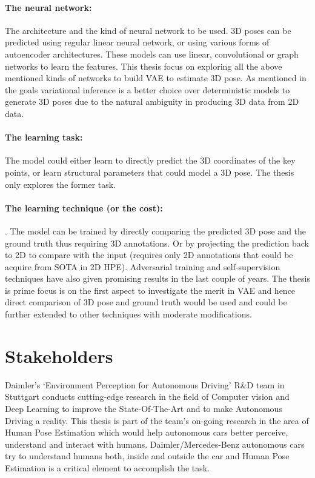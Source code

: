 \paragraph{The neural network:} The architecture and the kind of neural network to be used. 3D poses can be predicted using regular linear neural network, or using various forms of autoencoder architectures. These models can use linear, convolutional or graph networks to learn the features. This thesis focus on exploring all the above mentioned kinds of networks to build \ac{VAE} to estimate 3D pose. As mentioned in the goals variational inference is a better choice over deterministic models to generate 3D poses due to the natural ambiguity in producing 3D data from 2D data.  

\paragraph{The learning task:} The model could either learn to directly predict the 3D coordinates of the key points, or learn structural parameters that could model a 3D pose. The thesis only explores the former task.

\paragraph{The learning technique (or the cost):}. The model can be trained by directly comparing the predicted 3D pose and the ground truth thus requiring 3D annotations. Or by projecting the prediction back to 2D to compare with the input (requires only 2D annotations that could be acquire from \ac{SOTA} in 2D \ac{HPE}). Adversarial training and self-supervision techniques have also given promising results in the last couple of years. The thesis is prime focus is on the first aspect to investigate the merit in \ac{VAE} and hence direct comparison of 3D pose and ground truth would be used and could be further extended to other techniques with moderate modifications.


\section{Stakeholders}
Daimler’s ‘Environment Perception for Autonomous Driving’ R\&D team in Stuttgart conducts cutting-edge research in the field of Computer vision and Deep Learning to improve the State-Of-The-Art and to make Autonomous Driving a reality. This thesis is part of the team’s on-going research in the area of Human Pose Estimation which would help autonomous cars better perceive, understand and interact with humans. Daimler/Mercedes-Benz autonomous cars try to understand humans both, inside and outside the car and Human Pose Estimation is a critical element to accomplish the task.

